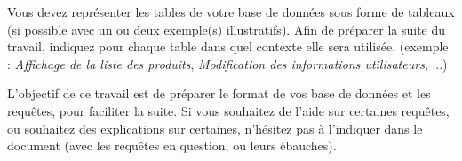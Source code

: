 

\vspace*{0.7cm}

\noindent {}

\bigskip

\noindent Vous devez représenter les tables de votre base de données sous forme de tableaux (si possible avec un ou deux exemple(s) illustratifs).
Afin de préparer la suite du travail, indiquez pour chaque table dans quel contexte elle sera utilisée.
(exemple : \textit{Affichage de la liste des produits}, \textit{Modification des informations utilisateurs}, ...)

\bigskip

\noindent L'objectif de ce travail est de préparer le format de vos base de données et les requêtes, pour faciliter la suite.
Si vous souhaitez de l'aide sur certaines requêtes, ou souhaitez des explications sur certaines, n'hésitez pas à l'indiquer dans le document (avec les requêtes en question, ou leurs ébauches).
